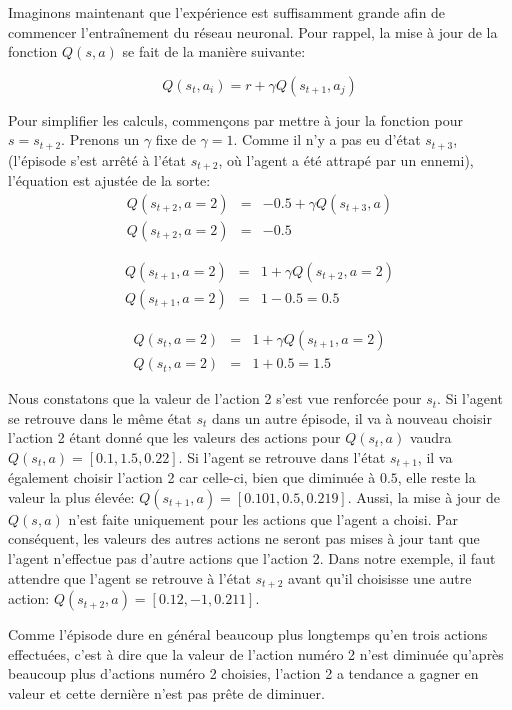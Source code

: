 \documentclass[11pt,a4paper]{report}
\begin{document}
  \par Imaginons maintenant que l'expérience est suffisamment grande afin de commencer l’entraînement du réseau neuronal. Pour rappel, la mise à jour de la fonction $Q(s,a)$ se fait de la manière suivante: 
  
  $$Q(s_t,a_i) = r + \gamma Q(s_{t+1}, a_j)$$ 
  
  \par Pour simplifier les calculs, commençons par mettre à jour la fonction pour $s = s_{t+2}$. Prenons un $\gamma$ fixe de $\gamma=1$. Comme il n'y a pas eu d'état $s_{t+3}$, (l'épisode s'est arrêté à l'état $s_{t+2}$, où l'agent a été attrapé par un ennemi), l'équation est ajustée de la sorte:
  \begin{eqnarray}
  Q(s_{t+2},a=2) &=& -0.5 + \gamma Q(s_{t+3},a) \\
  Q(s_{t+2},a=2) &=& -0.5 
  \end{eqnarray}
  
 \begin{eqnarray}
  Q(s_{t+1},a=2) &=&  1 + \gamma Q(s_{t+2},a=2) \\
  Q(s_{t+1},a=2) &=&  1 - 0.5 = 0.5 
  \end{eqnarray}
  
 \begin{eqnarray}
  Q(s_t,a=2) &=&  1 + \gamma Q(s_{t+1},a=2) \\
  Q(s_t,a=2) &=&  1 + 0.5 = 1.5
  \end{eqnarray}
  
  \par Nous constatons que la valeur de l'action 2 s'est vue renforcée pour $s_t$. Si l'agent se retrouve dans le même état $s_t$ dans un autre épisode, il va à nouveau choisir l'action 2 étant donné que les valeurs des actions pour $Q(s_t,a)$ vaudra $Q(s_t, a) = [0.1, 1.5, 0.22]$. Si l'agent se retrouve dans l'état $s_{t+1}$, il va également choisir l'action 2 car celle-ci, bien que diminuée à $0.5$, elle reste la valeur la plus élevée: $Q(s_{t+1}, a) = [0.101, 0.5, 0.219]$. Aussi, la mise à jour de $Q(s,a)$ n'est faite uniquement pour les actions que l'agent a choisi. Par conséquent, les valeurs des autres actions ne seront pas mises à jour tant que l'agent n'effectue pas d'autre actions que l'action 2. Dans notre exemple, il faut attendre que l'agent se retrouve à l'état $s_{t+2}$ avant qu'il choisisse une autre action: $Q(s_{t+2}, a) = [0.12, -1, 0.211]$.  
  
  \par Comme l'épisode dure en général beaucoup plus longtemps qu'en trois actions effectuées, c'est à dire que la valeur de l'action numéro 2 n'est diminuée qu'après beaucoup plus d'actions numéro 2 choisies, l'action 2 a tendance a gagner en valeur et cette dernière n'est pas prête de diminuer. 
  
\end{document}
